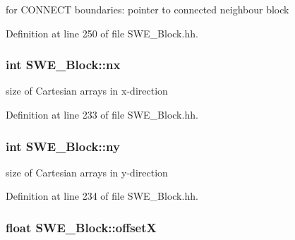 for C\+O\+N\+N\+E\+CT boundaries\+: pointer to connected neighbour block 



Definition at line 250 of file S\+W\+E\+\_\+\+Block.\+hh.

\subsubsection[{\texorpdfstring{nx}{nx}}]{\setlength{\rightskip}{0pt plus 5cm}int S\+W\+E\+\_\+\+Block\+::nx\hspace{0.3cm}{\ttfamily [protected]}}\hypertarget{classSWE__Block_a46ec0dc1157997bd255fb39924f1e2bb}{}\label{classSWE__Block_a46ec0dc1157997bd255fb39924f1e2bb}


size of Cartesian arrays in x-\/direction 



Definition at line 233 of file S\+W\+E\+\_\+\+Block.\+hh.

\subsubsection[{\texorpdfstring{ny}{ny}}]{\setlength{\rightskip}{0pt plus 5cm}int S\+W\+E\+\_\+\+Block\+::ny\hspace{0.3cm}{\ttfamily [protected]}}\hypertarget{classSWE__Block_a3f139630d12423eb4bd7df3e45c7f5da}{}\label{classSWE__Block_a3f139630d12423eb4bd7df3e45c7f5da}


size of Cartesian arrays in y-\/direction 



Definition at line 234 of file S\+W\+E\+\_\+\+Block.\+hh.

\subsubsection[{\texorpdfstring{offsetX}{offsetX}}]{\setlength{\rightskip}{0pt plus 5cm}float S\+W\+E\+\_\+\+Block\+::offsetX\hspace{0.3cm}{\ttfamily [protected]}}\hypertarget{classSWE__Block_aa9e9b1fa797c133c4989e4c54f09b542}{}\label{classSWE__Block_aa9e9b1fa797c133c4989e4c54f09b542}


